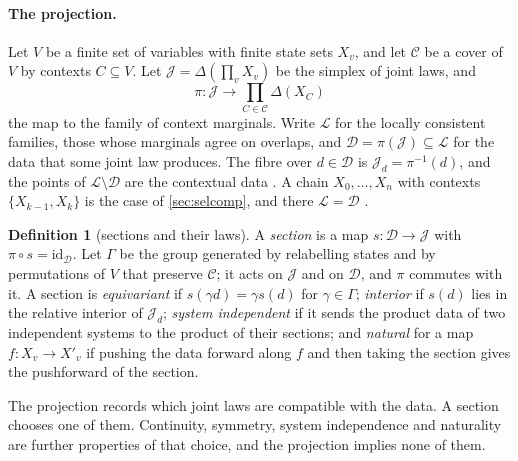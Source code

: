 \documentclass[11pt]{article}
\theoremstyle{definition}\newtheorem{definition}[theorem]{Definition}\newtheorem{remark}[theorem]{Remark}\newtheorem{example}[theorem]{Example}\newtheorem{problem}[theorem]{Open problem}\crefname{problem}{Problem}{Problems}
\begin{document}
\paragraph{The projection.} Let $V$ be a finite set of variables with finite state sets $X_v$, and let $\mathcal C$ be a cover of $V$ by contexts $C\subseteq V$. Let $\mathcal J=\Delta(\prod_vX_v)$ be the simplex of joint laws, and
\[
\pi:\mathcal J\longrightarrow\textstyle\prod_{C\in\mathcal C}\Delta(X_C)
\]
the map to the family of context marginals. Write $\mathcal L$ for the locally consistent families, those whose marginals agree on overlaps, and $\mathcal D=\pi(\mathcal J)\subseteq\mathcal L$ for the data that some joint law produces. The fibre over $d\in\mathcal D$ is $\mathcal J_d=\pi^{-1}(d)$, and the points of $\mathcal L\setminus\mathcal D$ are the contextual data \cite{AbramskyBrandenburger2011}. A chain $X_0,\dots,X_n$ with contexts $\{X_{k-1},X_k\}$ is the case of \cref{sec:selcomp}, and there $\mathcal L=\mathcal D$ \cite{Vorobev1962}.

\begin{definition}[sections and their laws]\label{def:section}
A \emph{section} is a map $s:\mathcal D\to\mathcal J$ with $\pi\circ s=\mathrm{id}_{\mathcal D}$. Let $\Gamma$ be the group generated by relabelling states and by permutations of $V$ that preserve $\mathcal C$; it acts on $\mathcal J$ and on $\mathcal D$, and $\pi$ commutes with it. A section is \emph{equivariant} if $s(\gamma d)=\gamma s(d)$ for $\gamma\in\Gamma$; \emph{interior} if $s(d)$ lies in the relative interior of $\mathcal J_d$; \emph{system independent} if it sends the product data of two independent systems to the product of their sections; and \emph{natural} for a map $f:X_v\to X'_v$ if pushing the data forward along $f$ and then taking the section gives the pushforward of the section.
\end{definition}

The projection records which joint laws are compatible with the data. A section chooses one of them. Continuity, symmetry, system independence and naturality are further properties of that choice, and the projection implies none of them.
\end{document}
